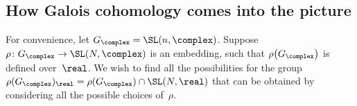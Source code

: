 %


\subsection{How Galois cohomology comes into the picture}
For convenience, let $G_{\complex} = \SL(n,\complex)$. Suppose $\rho \colon G_{\complex} \to \SL(N,\complex)$ is an embedding, such that $\rho \bigl( G_{\complex} \bigr)$ is defined over~$\real$. We wish to find all the possibilities for the group 
	$ \rho(G_{\complex})_\real = \rho (G_{\complex}) \cap \SL(N,\real) $
that can be obtained by considering all the possible choices of~$\rho$. 

